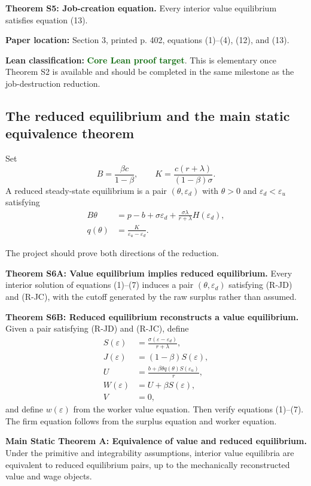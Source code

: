 \documentclass[11pt]{article}
\newcommand{\epsd}{\varepsilon_d}
\newcommand{\epsu}{\varepsilon_u}
\newcommand{\paperloc}[1]{\textbf{Paper location:} #1}
\newcommand{\leanclass}[1]{\textbf{Lean classification:} #1}
\newcommand{\core}{\textcolor{darkGreen}{\textbf{Core Lean proof target}}}
\newcommand{\resultname}[1]{\medskip\noindent\textbf{#1.}}
\begin{document}
\resultname{Theorem S5: Job-creation equation}
Every interior value equilibrium satisfies equation (13).

\paperloc{Section 3, printed p. 402, equations (1)--(4), (12), and (13).}

\leanclass{\core.}
This is elementary once Theorem S2 is available and should be completed in the same milestone as the job-destruction reduction.

\subsection{The reduced equilibrium and the main static equivalence theorem}

Set
\[
 B=\frac{\beta c}{1-\beta},
 \qquad
 K=\frac{c(r+\lambda)}{(1-\beta)\sigma}.
\]
A reduced steady-state equilibrium is a pair $(\theta,\epsd)$ with $\theta>0$ and $\epsd<\epsu$ satisfying
\begin{align}
 B\theta&=p-b+\sigma\epsd
 +\frac{\sigma\lambda}{r+\lambda}H(\epsd), \tag{R-JD}\\
 q(\theta)&=\frac{K}{\epsu-\epsd}. \tag{R-JC}
\end{align}

The project should prove both directions of the reduction.

\resultname{Theorem S6A: Value equilibrium implies reduced equilibrium}
Every interior solution of equations (1)--(7) induces a pair $(\theta,\epsd)$ satisfying (R-JD) and (R-JC), with the cutoff generated by the raw surplus rather than assumed.

\resultname{Theorem S6B: Reduced equilibrium reconstructs a value equilibrium}
Given a pair satisfying (R-JD) and (R-JC), define
\begin{align*}
 S(\varepsilon)&=\frac{\sigma(\varepsilon-\epsd)}{r+\lambda},\\
 J(\varepsilon)&=(1-\beta)S(\varepsilon),\\
 U&=\frac{b+\beta\theta q(\theta)S(\epsu)}{r},\\
 W(\varepsilon)&=U+\beta S(\varepsilon),\\
 V&=0,
\end{align*}
and define $w(\varepsilon)$ from the worker value equation. Then verify equations (1)--(7). The firm equation follows from the surplus equation and worker equation.

\resultname{Main Static Theorem A: Equivalence of value and reduced equilibrium}
Under the primitive and integrability assumptions, interior value equilibria are equivalent to reduced equilibrium pairs, up to the mechanically reconstructed value and wage objects.
\end{document}
